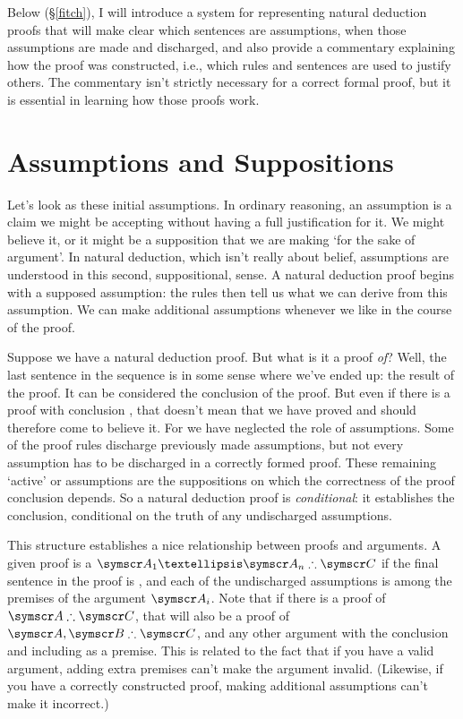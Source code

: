 Below (§\ref{fitch}), I will introduce a system for representing natural deduction proofs that will make clear which sentences are assumptions, when those assumptions are made and discharged, and also provide a commentary explaining how the proof was constructed, i.e., which rules and sentences are used to justify others. The commentary isn't strictly necessary for a correct formal proof, but it is essential in learning how those proofs work. 

\section{Assumptions and Suppositions}

Let's look as these initial assumptions. In ordinary reasoning, an assumption is a claim we might be accepting without having a full justification for it. We might believe it, or it might be a supposition that we are making `for the sake of argument'. In natural deduction, which isn't really about belief, assumptions are understood in this second, suppositional, sense. A natural deduction proof begins with a supposed assumption: the rules then tell us what we can derive from this assumption. We can make additional assumptions whenever we like in the course of the proof.

Suppose we have a natural deduction proof. But what is it a proof \emph{of}? Well, the last sentence in the sequence is in some sense where we've ended up:  the result of the proof. It can be considered the conclusion of the proof. But even if there is a proof with conclusion , that doesn't mean that we have proved  and should therefore come to believe it. For we have neglected the role of assumptions. Some of the proof rules discharge previously made assumptions, but not every assumption has to be discharged in a correctly formed proof. These remaining `active' or  assumptions are the suppositions on which the correctness of the proof conclusion depends. So a natural deduction proof is \emph{conditional}: it establishes the conclusion, conditional on the truth of any undischarged assumptions. 

This structure establishes a nice relationship between proofs and arguments. A given proof is a  $\meta{A}_{1} … \meta{A}_{n} \ttherefore \meta{C}$ if the final sentence in the proof is , and each of the undischarged assumptions is among the premises of the argument $\meta{A}_{i}$. Note that if there is a proof of $\meta{A} \ttherefore \meta{C}$, that will also be a proof of $\meta{A},\meta{B} \ttherefore \meta{C}$, and any other argument with the conclusion  and including  as a premise. This is related to the fact that if you have a valid argument, adding extra premises can't make the argument invalid. (Likewise, if you have a correctly constructed proof, making additional assumptions can't make it incorrect.) 

